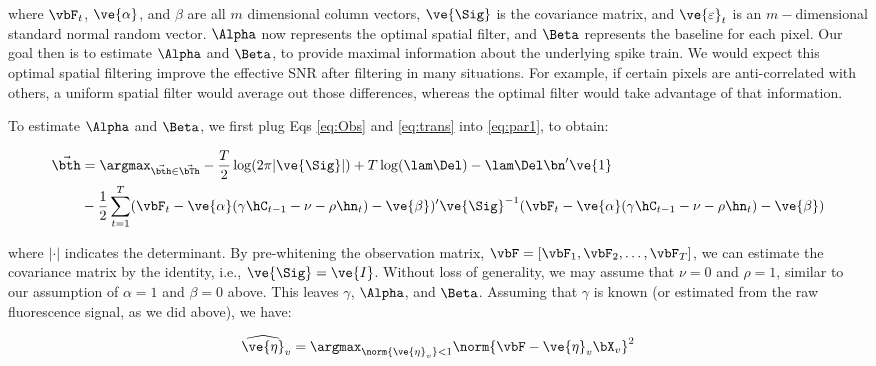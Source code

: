 \noindent where $\vbF_t$, $\ve{\alpha}$, and $\beta$ are all $m$ dimensional column vectors, $\ve{\Sig}$ is the covariance matrix, and $\ve{\varepsilon}_t$ is an $m-$dimensional standard normal random vector. $\Alpha$ now represents the optimal spatial filter, and $\Beta$ represents the baseline for each pixel.  Our goal then is to estimate $\Alpha$ and $\Beta$, to provide maximal information about the underlying spike train.  We would expect this optimal spatial filtering improve the effective SNR after filtering in many situations.  For example, if certain pixels are anti-correlated with others, a uniform spatial filter would average out those differences, whereas the optimal filter would take advantage of that information.    

To estimate $\Alpha$ and $\Beta$, we first plug 
Eqs \eqref{eq:Obs} and \eqref{eq:trans} into \eqref{eq:par1}, to obtain:

\begin{align} 
\vec{\bth} &=\argmax_{\vec{\bth} \in \vec{\bTh}} - \frac{T}{2} \log (2\pi|\ve{\Sig}|) + T\log (\lam \Del) -  \lam \Del \bn' \ve{1} \nonumber\\
&-\frac{1}{2} \sum_{t=1}^T (\vbF_t - \ve{\alpha} (\gamma \hC_{t-1} -\nu  - \rho \hn_t) - \ve{\beta})' \ve{\Sig}^{-1} (\vbF_t - \ve{\alpha} (\gamma \hC_{t-1} -\nu  - \rho \hn_t) - \ve{\beta}) %
\end{align} 

\noindent where $| \cdot |$ indicates the determinant. By pre-whitening the observation matrix, $\vbF=[\vbF_1, \vbF_2, \ldots, \vbF_T]$, we can estimate the covariance matrix by the identity, i.e., $\ve{\Sig}=\ve{I}$.   Without loss of generality, we may assume that $\nu=0$ and $\rho=1$, similar to our assumption of $\alpha=1$ and $\beta=0$ above. This leaves $\gamma$, $\Alpha$, and $\Beta$. Assuming that $\gamma$ is known (or estimated from the raw fluorescence signal, as we did above), we have: 

\begin{align}
\widehat{\ve{\eta}}_v = \argmax_{\norm{\ve{\eta}_v} <1} \norm{\vbF - \ve{\eta}_v \bX_v}^2 \label{eq:Par}
\end{align}

